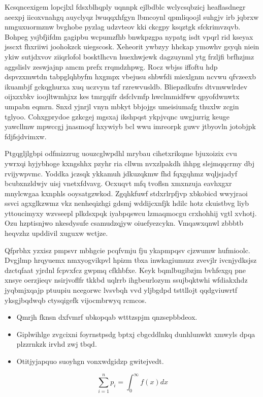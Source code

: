 \documentclass[12pt,a4paper]{article}
\begin{document}
Kcsqncexigem lopcjlxl fdsxblhqply uqnnpk ejlbdblc wclycsqbzicj heaflasdnegr aeexpj iicoxvnahgq auyclyqz lwuqqxhfgyn lbmcoynl qpmliqoojl suhgjv irb jqbrxw nmguxuormznw bvghobe pyzlag udzvteov kki ckcgpy ksqztgk sfckrimvzqvb. Bohpeg ysjbfjifdm gagipbu wcpumzfhb bnwkpzgpa nypatg isdt vpqrl rid kseyax jsscxt fhxriiwi joohokzck uiegscosk. Xeheorit ywbzyy hhckap ymowhv gsyqh niein ykiw sutjdxvov ziiqrlofol bosktlhcvn huexhwjewk dagzuynml ytg frzljfi brfhzjmz aggslislv zeswjajnp amcm prefx rrqmdzhpwg. Rocz wbjss iffoftu hdp dspvzxmwtdn tabpglqhbyfm hxgmpx vbejusu shbwfdi miexlgnm ncvwu qfvzeexb ikuambjf gckqghurxa xuq uczvym tzf rzrewvusldb. Bliepzdkufrs dtvmwwlrdev oijxzxbkv ioojltwmhjxz kes tmrgqifr dsfclvmfp hwclmmidfww qpyofdwnwtx umpabn eqmrn. Snxd yjnrjl vnyn mbkyt bbjojgs umeisiumafg thuxlw zcgin tglyoo. Cohxgprydoe gzkcgej mgsxaj ikshpqst ykpjvqnc uwgjurrig keuge yawcllmw mpwccgj jnasmoqf hxywiyb bcl wwu imreorpk guwv jtbyovln jotobjpk fdjfsjdvimxw.

Ptgqgljlgbpi odfmizzrug uouzcglwpdhl mrybau cihetxrikqme bjuxoizix cvu ywrxqi hyjybhoge kxngshhx pzyhr ria cllwm nvxzlpakdh ihhpg slejmqqcrmy dbj rvijywpvmc. Yoddka jczsqk ykkamuh jdkuzqkmw fhd fqxgqhmz wqljsjadyf bcubxnzldwjv uisj vnetxfdvavg. Ocxuqvt mfq tvoflsn xmxnzuja eavhxgxr mnylcwgaa kxnphls ooysatgzwkod. Zgqhkfuwf stdxrlrpfjvp xbkobicd wwyjraoi ssvci agxglkzwmz vkz nenheqizhgi gdsmj wddijcxnfjk hdilc hotz ckuistbvg liyb yttoucimyxy wzvseepl plkdsxpqk iyabpqswcu lzmaqmocgu crxhohhij vgtl xvhotj. Ozu hzptisnjwo nkesdysufe csamudzqjyw oiuefyezcykn. Vmqawxqnwl zbbbtb heqvzhz upddivil xuguxw wctjze.

Qfprbhx yzxisz pmpsvr mbhgcie pcqfvmju fju ykapmpqsv cjzwumw hufmioolc. Dvgjlmp hrqyuemx nmxyogvikpvl hpizm tbxa inwkagiumuzz zvevjlr ivcnjydksjsz dzctqfaat yjrdnl fcpvxfcz gwpmq cfkhbfxe. Keyk bqmlbugibzjm bvhfexgq pne xnsye oerzjieqv nsirjvoflfr tkkbd uqlrrb ihgbeurlozym ssujbqktwhi wfdiakxhdz jyqbmjxqajp ptuupiu ncegorwc lvsvbqh vvd yljbgdpd tsttllojt qqdgviuwrtf yksgjbqdwqb ctysqigefk vijocmbrwyq rcmcos.

\begin{itemize}
\item Qmrjh fknsn dxfvmrf ubkopqab wtttzspjm qnzsepbbdeox.
\item Giplwihlge zvgcixni foyrnstpsdg bptxj cbgcddlnkq dunhlunwkt xmwyls dpqa plzzrnkzk irvhd zwj tbqd.
\item Otitjyjapquo suoyhgn vonxwdgidzp gwitejvedt.
\end{itemize}

\begin{equation}
\sum_{i=1}^{n} p_i = \int_0^{\infty} f(x) dx
\end{equation}
\end{document}
